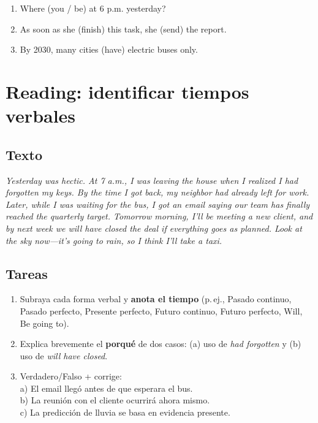 \documentclass[11pt,a4paper]{article}
\begin{document}
\begin{enumerate}
  \item Where \underline{\hspace{2.2cm}} (you / be) at 6 p.m. yesterday?
  \item As soon as she \underline{\hspace{2.2cm}} (finish) this task, she \underline{\hspace{2.2cm}} (send) the report.
  \item By 2030, many cities \underline{\hspace{2.2cm}} (have) electric buses only.
\end{enumerate}

\section{Reading: identificar tiempos verbales}
\subsection*{Texto}
\textit{Yesterday was hectic. At 7 a.m., I was leaving the house when I realized I had forgotten my keys. By the time I got back, my neighbor had already left for work. Later, while I was waiting for the bus, I got an email saying our team has finally reached the quarterly target. Tomorrow morning, I’ll be meeting a new client, and by next week we will have closed the deal if everything goes as planned. Look at the sky now—it's going to rain, so I think I’ll take a taxi.}

\subsection*{Tareas}
\begin{enumerate}
  \item Subraya cada forma verbal y \textbf{anota el tiempo} (p.\,ej., Pasado continuo, Pasado perfecto, Presente perfecto, Futuro continuo, Futuro perfecto, Will, Be going to).
  \item Explica brevemente el \textbf{porqué} de dos casos: (a) uso de \emph{had forgotten} y (b) uso de \emph{will have closed}.
  \item Verdadero/Falso + corrige: \\
  a) El email llegó antes de que esperara el bus. \\
  b) La reunión con el cliente ocurrirá ahora mismo. \\
  c) La predicción de lluvia se basa en evidencia presente.
\end{enumerate}
\end{document}

